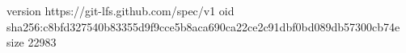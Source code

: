 version https://git-lfs.github.com/spec/v1
oid sha256:c8bfd327540b83355d9f9cce5b8aca690ca22ce2c91dbf0bd089db57300cb74e
size 22983
